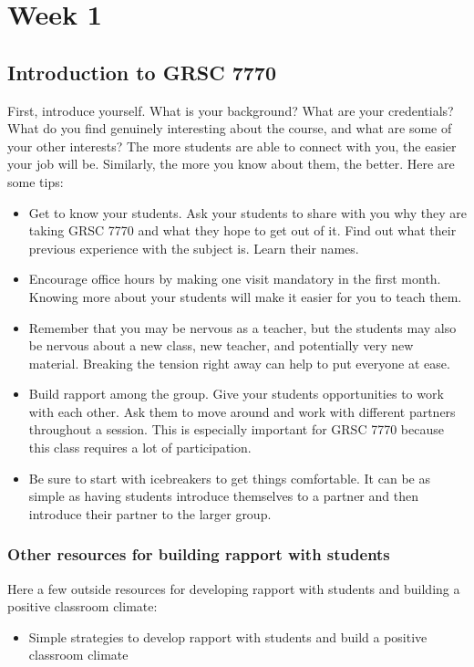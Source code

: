 \section{Week 1}
\label{sec:week-1}

\subsection{Introduction to GRSC 7770}
\label{sec:intr-grsc-7770}

First, introduce yourself. What is your background? What are your credentials? What do you find genuinely interesting about the course, and what are some of your other interests? The more students are able to connect with you, the easier your job will be. Similarly, the more you know about them, the better.  Here are some tips:

\begin{itemize}
\item Get to know your students. Ask your students to share with you why they are taking GRSC 7770 and what they hope to get out of it. Find out what their previous experience with the subject is. Learn their names. 
\item Encourage office hours by making one visit mandatory in the first month. Knowing more about your students will make it easier for you to teach them. 
\item Remember that you may be nervous as a teacher, but the students may also be nervous about a new class, new teacher, and potentially very new material. Breaking the tension right away can help to put everyone at ease.
\item Build rapport among the group.  Give your students opportunities to work with each other. Ask them to move around and work with different partners throughout a session.  This is especially important for GRSC 7770 because this class requires a lot of participation. 
\item Be sure to start with icebreakers to get things comfortable. It can be as simple as having students introduce themselves to a partner and then introduce their partner to the larger group.
\end{itemize}

\subsubsection{Other resources for building rapport with students}
\label{sec:other-reso-build}

Here a few outside resources for developing rapport with students and building a positive classroom climate:
\begin{itemize}
\item Simple strategies to develop rapport with students and build a positive classroom climate
\end{itemize}


